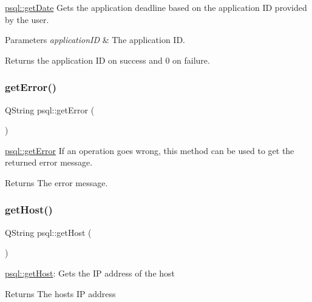 \mbox{\hyperlink{classpsql_a561f96bfe7e9d092077712dd6b186af8}{psql\+::get\+Date}} Gets the application deadline based on the application ID provided by the user. 


\begin{DoxyParams}{Parameters}
{\em application\+ID} & The application ID. \\
\hline
\end{DoxyParams}
\begin{DoxyReturn}{Returns}
the application ID on success and 0 on failure. 
\end{DoxyReturn}
\mbox{\label{classpsql_a5f51e254b67ff932f287df2184ccc043}} 
\subsubsection{\texorpdfstring{get\+Error()}{getError()}}
{\footnotesize\ttfamily Q\+String psql\+::get\+Error (\begin{DoxyParamCaption}{ }\end{DoxyParamCaption})}



\mbox{\hyperlink{classpsql_a5f51e254b67ff932f287df2184ccc043}{psql\+::get\+Error}} If an operation goes wrong, this method can be used to get the returned error message. 

\begin{DoxyReturn}{Returns}
The error message. 
\end{DoxyReturn}
\mbox{\label{classpsql_a95d06ee661db0b9cf72605b983b04613}} 
\subsubsection{\texorpdfstring{get\+Host()}{getHost()}}
{\footnotesize\ttfamily Q\+String psql\+::get\+Host (\begin{DoxyParamCaption}{ }\end{DoxyParamCaption})}



\mbox{\hyperlink{classpsql_a95d06ee661db0b9cf72605b983b04613}{psql\+::get\+Host}}\+: Gets the IP address of the host 

\begin{DoxyReturn}{Returns}
The host\textquotesingle{}s IP address 
\end{DoxyReturn}
\mbox{\label{classpsql_aca1b2273937491e113089c1547caf49b}} 
